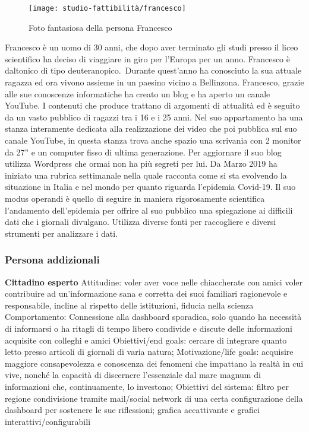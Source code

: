 \begin{wrapfigure}{l}{8cm}
    \texttt{[image: studio-fattibilità/francesco]}
    \caption{Foto fantasiosa della persona Francesco}
\end{wrapfigure}

Francesco è un uomo di 30 anni, che dopo aver terminato gli studi presso il liceo scientifico ha deciso di viaggiare in giro per l'Europa per un anno. Francesco è daltonico di tipo deuteranopico. Durante quest'anno ha conosciuto la sua attuale ragazza ed ora vivono assieme in un paesino vicino a Bellinzona. Francesco, grazie alle sue conoscenze informatiche ha creato un blog e ha aperto un canale YouTube. I contenuti che produce trattano di argomenti di attualità ed è seguito da un vasto pubblico di ragazzi tra i 16 e i 25 anni. Nel suo appartamento ha una stanza interamente  dedicata alla realizzazione dei video che poi pubblica sul suo canale YouTube, in questa stanza trova anche spazio una scrivania con 2 monitor da 27'' e un computer fisso di ultima generazione. Per aggiornare il suo blog utilizza Wordpress che ormai non ha più segreti per lui.
Da Marzo 2019 ha iniziato una rubrica settimanale nella quale racconta come si sta evolvendo la situazione in Italia e nel mondo per quanto riguarda l'epidemia Covid-19.  Il suo modus operandi è quello di seguire in maniera rigorosamente scientifica l'andamento dell'epidemia per offrire al suo pubblico una spiegazione ai difficili dati che i giornali divulgano. Utilizza diverse fonti per raccogliere e diversi strumenti per analizzare i dati. 

\subsubsection*{Persona addizionali}
\textbf{Cittadino esperto}
	Attitudine:
		voler aver voce nelle chiaccherate con amici
		voler contribuire ad un'informazione sana e corretta dei suoi familiari 
		ragionevole e responsabile, incline al rispetto delle istituzioni, fiducia nella scienza
	Comportamento: 
		Connessione alla dashboard sporadica, solo quando ha necessità di informarsi o ha ritagli di tempo libero
		condivide e discute delle informazioni acquisite con colleghi e amici
	Obiettivi/end goals:
		cercare di integrare quanto letto presso articoli di giornali di varia natura;
	Motivazione/life goals: acquisire maggiore consapevolezza e conoscenza dei fenomeni che impattano la realtà in cui vive, nonché la capacità di discernere l'essenziale dal mare magnum di informazioni che, continuamente, lo investono;
	Obiettivi del sistema:
		filtro per regione
		condivisione tramite mail/social network di una certa configurazione della dashboard per sostenere le sue riflessioni;
		grafica accattivante e grafici interattivi/configurabili

